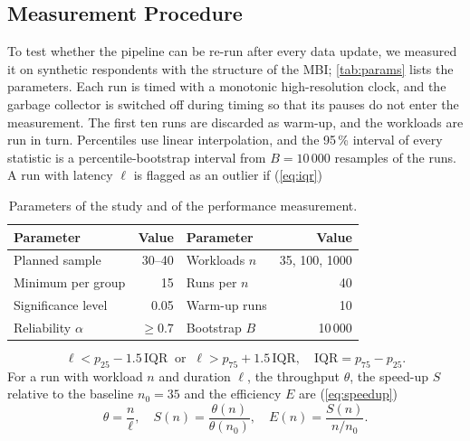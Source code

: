 \subsection{Measurement Procedure}\label{sec:measure}
To test whether the pipeline can be re-run after every data update, we measured
it on synthetic respondents with the structure of the MBI; \autoref{tab:params}
lists the parameters. Each run is timed with a monotonic high-resolution clock,
and the garbage collector is switched off during timing so that its pauses do not
enter the measurement. The first ten runs are discarded as warm-up, and the
workloads are run in turn. Percentiles use linear interpolation, and the 95\,\%
interval of every statistic is a percentile-bootstrap interval from $B=10\,000$
resamples of the runs. A run with latency $\ell$ is flagged as an outlier if
(\autoref{eq:iqr})

\begin{table}[b]
  \centering
  \caption{Parameters of the study and of the performance measurement.}
  \label{tab:params}
  \footnotesize
  \begin{tabular}{@{}lrlr@{}}
    \toprule
    Parameter & Value & Parameter & Value \\
    \midrule
    Planned sample & 30--40 & Workloads $n$ & 35, 100, 1000 \\
    Minimum per group & 15 & Runs per $n$ & 40 \\
    Significance level & 0.05 & Warm-up runs & 10 \\
    Reliability $\alpha$ & $\ge 0.7$ & Bootstrap $B$ & 10\,000 \\
    \bottomrule
  \end{tabular}
\end{table}

\begin{equation}
  \ell < p_{25} - 1.5\,\mathrm{IQR}
  \ \text{ or } \
  \ell > p_{75} + 1.5\,\mathrm{IQR},
  \quad \mathrm{IQR} = p_{75} - p_{25}.
  \label{eq:iqr}
\end{equation}
For a run with workload $n$ and duration $\ell$, the throughput $\theta$, the
speed-up $S$ relative to the baseline $n_0=35$ and the efficiency $E$ are
(\autoref{eq:speedup})
\begin{equation}
  \theta = \frac{n}{\ell},\quad
  S(n) = \frac{\theta(n)}{\theta(n_0)},\quad
  E(n) = \frac{S(n)}{n/n_0}.
  \label{eq:speedup}
\end{equation}
